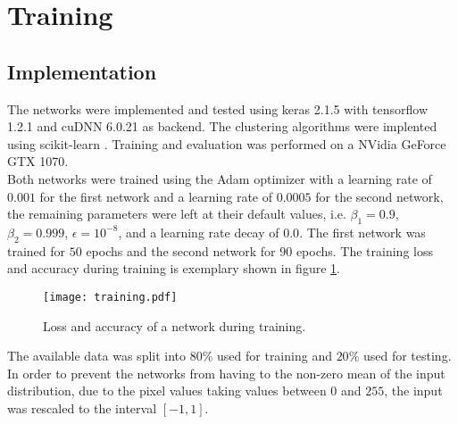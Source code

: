 \section{Training}

\subsection{Implementation}
The networks were implemented and tested using keras 2.1.5 \cite{chollet2015keras} with tensorflow 1.2.1 \cite{tensorflow2015-whitepaper} and cuDNN 6.0.21 \cite{Chetlur2014} as backend. The clustering algorithms were implented using scikit-learn \cite{scikit-learn}. Training and evaluation was performed on a NVidia GeForce GTX 1070.\\

Both networks were trained using the Adam optimizer with a learning rate of $0.001$ for the first network and a learning rate of $0.0005$ for the second network, the remaining parameters were left at their default values, i.e. $\beta_1=0.9$, $\beta_2=0.999$, $\epsilon=10^{-8}$, and a learning rate decay of $0.0$. The first network was trained for $50$ epochs and the second network for $90$ epochs. The training loss and accuracy during training is exemplary shown in figure \ref{fig:Training}. \\

\begin{figure}
\centering
\texttt{[image: training.pdf]}
\caption{Loss and accuracy of a network during training.}
\label{fig:Training}
\end{figure}

The available data was split into $80\%$ used for training and $20\%$ used for testing. In order to prevent the networks from having to the non-zero mean of the input distribution, due to the pixel values taking values between $0$ and $255$, the input was rescaled to the interval $[-1,1]$. \\

%

















